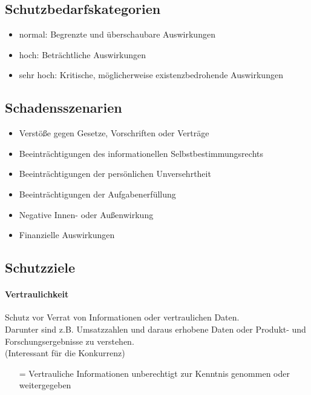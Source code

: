 \documentclass[asp1.tex]{subfiles}
\begin{document}
\subsection{Schutzbedarfskategorien}

\begin{itemize}
    \item normal: Begrenzte und überschaubare Auswirkungen \\
    \item hoch: Beträchtliche Auswirkungen \\
    \item sehr hoch: Kritische, möglicherweise existenzbedrohende Auswirkungen
\end{itemize}

\subsection{Schadensszenarien}

\begin{itemize}
    \item Verstöße gegen Gesetze, Vorschriften oder Verträge
    \item Beeinträchtigungen des informationellen Selbstbestimmungsrechts
    \item Beeinträchtigungen der persönlichen Unversehrtheit
    \item Beeinträchtigungen der Aufgabenerfüllung
    \item Negative Innen- oder Außenwirkung
    \item Finanzielle Auswirkungen
\end{itemize}

\subsection{Schutzziele}

\paragraph{Vertraulichkeit}
Schutz vor Verrat von Informationen oder vertraulichen Daten. \\
Darunter sind z.B. Umsatzzahlen und daraus erhobene Daten oder Produkt- und Forschungsergebnisse zu verstehen. \\
(Interessant für die Konkurrenz)
\begin{itemize}
    \item[=] Vertrauliche Informationen unberechtigt zur Kenntnis genommen oder weitergegeben
\end{itemize}
\end{document}
